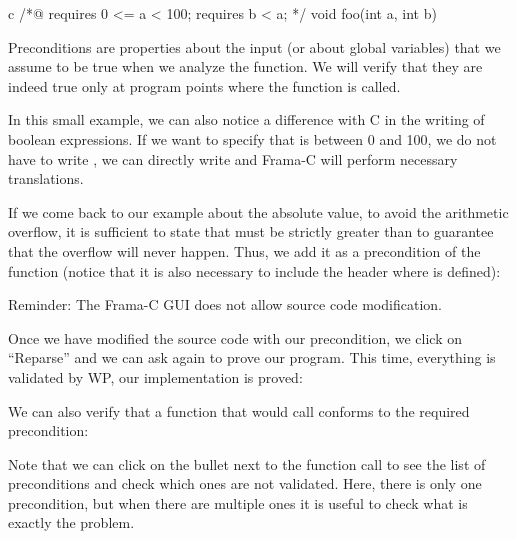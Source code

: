 \begin{CodeBlock}{c}
/*@
  requires 0 <= a < 100;
  requires b < a;
*/
void foo(int a, int b){

}
\end{CodeBlock}



Preconditions are properties about the input (or about
global variables) that we assume to be true when we analyze the
function. We will verify that they are indeed true only at program
points where the function is called.



In this small example, we can also notice a difference with C in the
writing of boolean expressions. If we want to specify that  is
between 0 and 100, we do not have to write ,
we can directly write  and Frama-C will
perform necessary translations.



If we come back to our example about the absolute value, to avoid the
arithmetic overflow, it is sufficient to state that  must
be strictly greater than  to guarantee that the
overflow will never happen. Thus, we add it as a precondition of the
function (notice that it is also necessary to include the header where
 is defined):






\begin{Warning}
  Reminder: The Frama-C GUI does not allow source code modification.
\end{Warning}


Once we have modified the source code with our precondition, we click on
``Reparse'' and we can ask again to prove our program. This time,
everything is validated by WP, our implementation is proved:





We can also verify that a function that would call 
conforms to the required precondition:







Note that we can click on the bullet next to the function call to see the
list of preconditions and check which ones are not validated. Here, there is
only one precondition, but when there are multiple ones it is useful to check
what is exactly the problem.

